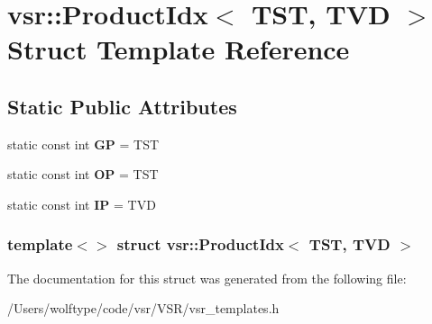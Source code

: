 \hypertarget{structvsr_1_1_product_idx_3_01_t_s_t_00_01_t_v_d_01_4}{\section{vsr\-:\-:Product\-Idx$<$ T\-S\-T, T\-V\-D $>$ Struct Template Reference}
\label{structvsr_1_1_product_idx_3_01_t_s_t_00_01_t_v_d_01_4}
}
\subsection*{Static Public Attributes}
\begin{DoxyCompactItemize}
\item 
\hypertarget{structvsr_1_1_product_idx_3_01_t_s_t_00_01_t_v_d_01_4_a9248cd02bfdcf1e0c521e260c82179ee}{static const int {\bfseries G\-P} = T\-S\-T}\label{structvsr_1_1_product_idx_3_01_t_s_t_00_01_t_v_d_01_4_a9248cd02bfdcf1e0c521e260c82179ee}

\item 
\hypertarget{structvsr_1_1_product_idx_3_01_t_s_t_00_01_t_v_d_01_4_a927f24a757dd7965878b60e0d683c4e0}{static const int {\bfseries O\-P} = T\-S\-T}\label{structvsr_1_1_product_idx_3_01_t_s_t_00_01_t_v_d_01_4_a927f24a757dd7965878b60e0d683c4e0}

\item 
\hypertarget{structvsr_1_1_product_idx_3_01_t_s_t_00_01_t_v_d_01_4_a0c6ff49f77912b7d4ac132d8649ed84f}{static const int {\bfseries I\-P} = T\-V\-D}\label{structvsr_1_1_product_idx_3_01_t_s_t_00_01_t_v_d_01_4_a0c6ff49f77912b7d4ac132d8649ed84f}

\end{DoxyCompactItemize}
\subsubsection*{template$<$$>$ struct vsr\-::\-Product\-Idx$<$ T\-S\-T, T\-V\-D $>$}



The documentation for this struct was generated from the following file\-:\begin{DoxyCompactItemize}
\item 
/\-Users/wolftype/code/vsr/\-V\-S\-R/vsr\-\_\-templates.\-h\end{DoxyCompactItemize}
